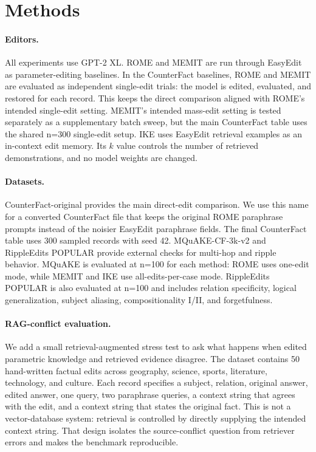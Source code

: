 \documentclass[11pt]{article}
\begin{document}
\section{Methods}

\paragraph{Editors.}
All experiments use GPT-2 XL. ROME and MEMIT are run through EasyEdit as parameter-editing baselines. In the CounterFact baselines, ROME and MEMIT are evaluated as independent single-edit trials: the model is edited, evaluated, and restored for each record. This keeps the direct comparison aligned with ROME's intended single-edit setting. MEMIT's intended mass-edit setting is tested separately as a supplementary batch sweep, but the main CounterFact table uses the shared n=300 single-edit setup. IKE uses EasyEdit retrieval examples as an in-context edit memory. Its $k$ value controls the number of retrieved demonstrations, and no model weights are changed.

\paragraph{Datasets.}
CounterFact-original provides the main direct-edit comparison. We use this name for a converted CounterFact file that keeps the original ROME paraphrase prompts instead of the noisier EasyEdit paraphrase fields. The final CounterFact table uses 300 sampled records with seed 42. MQuAKE-CF-3k-v2 and RippleEdits POPULAR provide external checks for multi-hop and ripple behavior. MQuAKE is evaluated at n=100 for each method: ROME uses one-edit mode, while MEMIT and IKE use all-edits-per-case mode. RippleEdits POPULAR is also evaluated at n=100 and includes relation specificity, logical generalization, subject aliasing, compositionality I/II, and forgetfulness.

\paragraph{RAG-conflict evaluation.}
We add a small retrieval-augmented stress test to ask what happens when edited parametric knowledge and retrieved evidence disagree. The dataset contains 50 hand-written factual edits across geography, science, sports, literature, technology, and culture. Each record specifies a subject, relation, original answer, edited answer, one query, two paraphrase queries, a context string that agrees with the edit, and a context string that states the original fact. This is not a vector-database system: retrieval is controlled by directly supplying the intended context string. That design isolates the source-conflict question from retriever errors and makes the benchmark reproducible.
\end{document}
